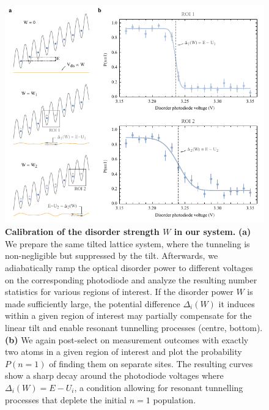 \begin{figure}[htbp]
	\centering
	\includegraphics{figures/MBL_Wcal.pdf}
	\caption{\label{fig:Wcal} \textbf {Calibration of the disorder strength $W$ in our system.}  \textbf{(a)} We prepare the same tilted lattice system, where the tunneling is non-negligible but suppressed by the tilt. Afterwards, we adiabatically ramp the optical disorder power to different voltages on the corresponding photodiode and analyze the resulting number statistics for various regions of interest. If the disorder power $W$ is made sufficiently large, the potential difference $\Delta_i(W)$ it induces within a given region of interest may partially compensate for the linear tilt and enable resonant tunnelling processes (centre, bottom). \textbf{(b)} We again post-select on measurement outcomes with exactly two atoms in a given region of interest and plot the probability $P(n=1)$ of finding them on separate sites. The resulting curves show a sharp decay around the photodiode voltages where $\Delta_i(W) = E-U_i$, a condition allowing for resonant tunnelling processes that deplete the initial $n=1$ population.}
\end{figure}


